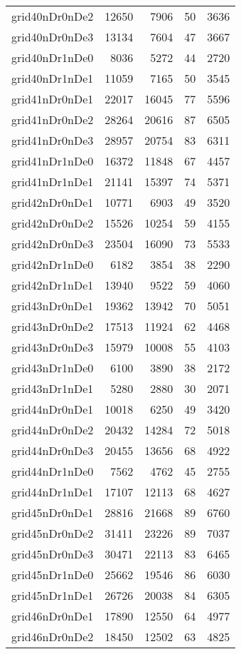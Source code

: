 \begin{longtable}{lrrrr}
grid40nDr0nDe2 & 12650 & 7906 & 50 & 3636 \\
grid40nDr0nDe3 & 13134 & 7604 & 47 & 3667 \\
grid40nDr1nDe0 & 8036 & 5272 & 44 & 2720 \\
grid40nDr1nDe1 & 11059 & 7165 & 50 & 3545 \\
grid41nDr0nDe1 & 22017 & 16045 & 77 & 5596 \\
grid41nDr0nDe2 & 28264 & 20616 & 87 & 6505 \\
grid41nDr0nDe3 & 28957 & 20754 & 83 & 6311 \\
grid41nDr1nDe0 & 16372 & 11848 & 67 & 4457 \\
grid41nDr1nDe1 & 21141 & 15397 & 74 & 5371 \\
grid42nDr0nDe1 & 10771 & 6903 & 49 & 3520 \\
grid42nDr0nDe2 & 15526 & 10254 & 59 & 4155 \\
grid42nDr0nDe3 & 23504 & 16090 & 73 & 5533 \\
grid42nDr1nDe0 & 6182 & 3854 & 38 & 2290 \\
grid42nDr1nDe1 & 13940 & 9522 & 59 & 4060 \\
grid43nDr0nDe1 & 19362 & 13942 & 70 & 5051 \\
grid43nDr0nDe2 & 17513 & 11924 & 62 & 4468 \\
grid43nDr0nDe3 & 15979 & 10008 & 55 & 4103 \\
grid43nDr1nDe0 & 6100 & 3890 & 38 & 2172 \\
grid43nDr1nDe1 & 5280 & 2880 & 30 & 2071 \\
grid44nDr0nDe1 & 10018 & 6250 & 49 & 3420 \\
grid44nDr0nDe2 & 20432 & 14284 & 72 & 5018 \\
grid44nDr0nDe3 & 20455 & 13656 & 68 & 4922 \\
grid44nDr1nDe0 & 7562 & 4762 & 45 & 2755 \\
grid44nDr1nDe1 & 17107 & 12113 & 68 & 4627 \\
grid45nDr0nDe1 & 28816 & 21668 & 89 & 6760 \\
grid45nDr0nDe2 & 31411 & 23226 & 89 & 7037 \\
grid45nDr0nDe3 & 30471 & 22113 & 83 & 6465 \\
grid45nDr1nDe0 & 25662 & 19546 & 86 & 6030 \\
grid45nDr1nDe1 & 26726 & 20038 & 84 & 6305 \\
grid46nDr0nDe1 & 17890 & 12550 & 64 & 4977 \\
grid46nDr0nDe2 & 18450 & 12502 & 63 & 4825 \\

\end{longtable}
